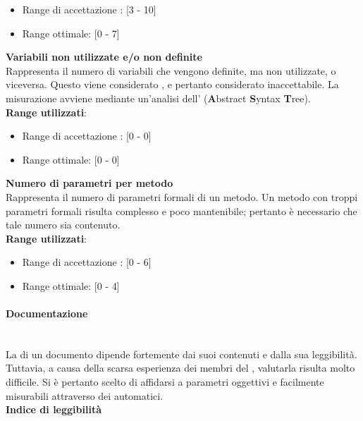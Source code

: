 \begin{itemize}
	\item Range di accettazione : [3 - 10]
	\item Range ottimale: [0 - 7]
\end{itemize}


\textbf{Variabili non utilizzate e/o non definite}\\

Rappresenta il numero di variabili che vengono definite, ma non utilizzate, o viceversa. Questo viene considerato , e pertanto considerato inaccettabile. La misurazione avviene mediante un'analisi dell'\textbf{} (\textbf{A}bstract \textbf{S}yntax \textbf{T}ree). \\

\textbf{Range utilizzati}:
\begin{itemize}
	\item Range di accettazione : [0 - 0]
	\item Range ottimale: [0 - 0]
\end{itemize}


\textbf{Numero di parametri per metodo}\\

Rappresenta il numero di parametri formali di un metodo. Un metodo con troppi parametri formali risulta complesso e poco mantenibile; pertanto è necessario che tale numero sia contenuto. \\

\textbf{Range utilizzati}:
\begin{itemize}
	\item Range di accettazione : [0 - 6]
	\item Range ottimale: [0 - 4]
\end{itemize}

\paragraph{Documentazione}\mbox{}\\
\hypertarget{metriche_documenti}{}
La  di un documento dipende fortemente dai suoi contenuti e dalla sua leggibilità. Tuttavia, a causa della scarsa esperienza dei membri del , valutarla risulta molto difficile. Si è pertanto scelto di affidarsi a parametri oggettivi e facilmente misurabili attraverso dei  automatici.\\

\textbf{Indice di leggibilità}\\


